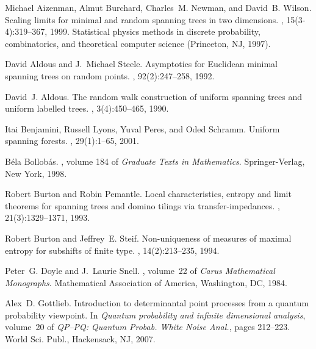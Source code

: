 \documentclass[11pt]{article}
\providecommand{\1}{\mathBB{1}}
\begin{document}

%
\def\cprime{$'$}
\begin{thebibliography}{10}

Michael Aizenman, Almut Burchard, Charles~M. Newman, and David~B. Wilson.
\newblock Scaling limits for minimal and random spanning trees in two
  dimensions.
, 15(3-4):319--367, 1999.
\newblock Statistical physics methods in discrete probability, combinatorics,
  and theoretical computer science (Princeton, NJ, 1997).

David Aldous and J.~Michael Steele.
\newblock Asymptotics for {E}uclidean minimal spanning trees on random points.
, 92(2):247--258, 1992.

David~J. Aldous.
\newblock The random walk construction of uniform spanning trees and uniform
  labelled trees.
, 3(4):450--465, 1990.

Itai Benjamini, Russell Lyons, Yuval Peres, and Oded Schramm.
\newblock Uniform spanning forests.
, 29(1):1--65, 2001.

B\'{e}la Bollob\'{a}s.
, volume 184 of {\em Graduate Texts in
  Mathematics}.
\newblock Springer-Verlag, New York, 1998.

Robert Burton and Robin Pemantle.
\newblock Local characteristics, entropy and limit theorems for spanning trees
  and domino tilings via transfer-impedances.
, 21(3):1329--1371, 1993.

Robert Burton and Jeffrey~E. Steif.
\newblock Non-uniqueness of measures of maximal entropy for subshifts of finite
  type.
, 14(2):213--235, 1994.

Peter~G. Doyle and J.~Laurie Snell.
, volume~22 of {\em Carus
  Mathematical Monographs}.
\newblock Mathematical Association of America, Washington, DC, 1984.

Alex~D. Gottlieb.
\newblock Introduction to determinantal point processes from a quantum
  probability viewpoint.
\newblock In {\em Quantum probability and infinite dimensional analysis},
  volume~20 of {\em QP--PQ: Quantum Probab. White Noise Anal.}, pages 212--223.
  World Sci. Publ., Hackensack, NJ, 2007.


\end{thebibliography}
\end{document}
